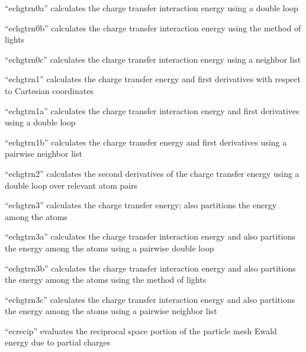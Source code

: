 \documentclass[letterpaper,11pt,english]{sphinxmanual}
\begin{document}
“echgtrn0a” calculates the charge transfer interaction energy
using a double loop


“echgtrn0b” calculates the charge transfer interaction energy
using the method of lights


“echgtrn0c” calculates the charge transfer interaction energy
using a neighbor list


“echgtrn1” calculates the charge transfer energy and first
derivatives with respect to Cartesian coordinates


“echgtrn1a” calculates the charge transfer interaction energy
and first derivatives using a double loop


“echgtrn1b” calculates the charge transfer energy and first
derivatives using a pairwise neighbor list


“echgtrn2” calculates the second derivatives of the charge
transfer energy using a double loop over relevant atom pairs


“echgtrn3” calculates the charge transfer energy; also partitions
the energy among the atoms


“echgtrn3a” calculates the charge transfer interaction energy
and also partitions the energy among the atoms using a pairwise
double loop


“echgtrn3b” calculates the charge transfer interaction energy
and also partitions the energy among the atoms using the method
of lights


“echgtrn3c” calculates the charge transfer interaction energy
and also partitions the energy among the atoms using a pairwise
neighbor list


“ecrecip” evaluates the reciprocal space portion of the particle
mesh Ewald energy due to partial charges
\end{document}
